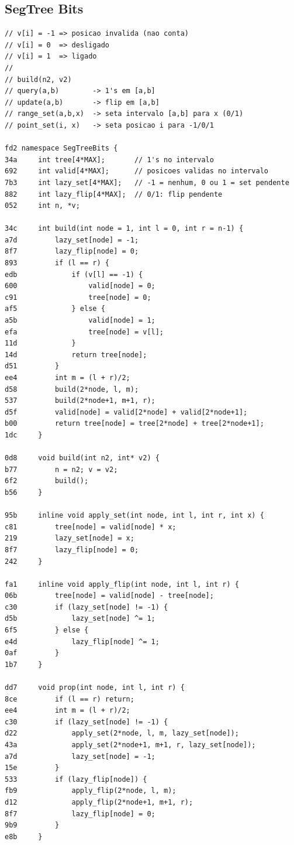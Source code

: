 \documentclass[11pt, a4paper, twoside]{article}
\begin{document}
\subsection{SegTree Bits}
\begin{lstlisting}
// v[i] = -1 => posicao invalida (nao conta)
// v[i] = 0  => desligado
// v[i] = 1  => ligado
//
// build(n2, v2)
// query(a,b)        -> 1's em [a,b]
// update(a,b)       -> flip em [a,b]
// range_set(a,b,x)  -> seta intervalo [a,b] para x (0/1)
// point_set(i, x)   -> seta posicao i para -1/0/1

fd2 namespace SegTreeBits {
34a     int tree[4*MAX];       // 1's no intervalo
692     int valid[4*MAX];      // posicoes validas no intervalo
7b3     int lazy_set[4*MAX];   // -1 = nenhum, 0 ou 1 = set pendente
882     int lazy_flip[4*MAX];  // 0/1: flip pendente
052     int n, *v;
    
34c     int build(int node = 1, int l = 0, int r = n-1) {
a7d         lazy_set[node] = -1;
8f7         lazy_flip[node] = 0;
893         if (l == r) {
edb             if (v[l] == -1) {
600                 valid[node] = 0;
c91                 tree[node] = 0;
af5             } else {
a5b                 valid[node] = 1;
efa                 tree[node] = v[l];
11d             }
14d             return tree[node];
d51         }
ee4         int m = (l + r)/2;
d58         build(2*node, l, m);
537         build(2*node+1, m+1, r);
d5f         valid[node] = valid[2*node] + valid[2*node+1];
b00         return tree[node] = tree[2*node] + tree[2*node+1];
1dc     }
    
0d8     void build(int n2, int* v2) {
b77         n = n2; v = v2;
6f2         build();
b56     }
    
95b     inline void apply_set(int node, int l, int r, int x) {
c81         tree[node] = valid[node] * x;
219         lazy_set[node] = x;
8f7         lazy_flip[node] = 0;
242     }
    
fa1     inline void apply_flip(int node, int l, int r) {
06b         tree[node] = valid[node] - tree[node];
c30         if (lazy_set[node] != -1) {
d5b             lazy_set[node] ^= 1;
6f5         } else {
e4d             lazy_flip[node] ^= 1;
0af         }
1b7     }
    
dd7     void prop(int node, int l, int r) {
8ce         if (l == r) return;
ee4         int m = (l + r)/2;
c30         if (lazy_set[node] != -1) {
d22             apply_set(2*node, l, m, lazy_set[node]);
43a             apply_set(2*node+1, m+1, r, lazy_set[node]);
a7d             lazy_set[node] = -1;
15e         }
533         if (lazy_flip[node]) {
fb9             apply_flip(2*node, l, m);
d12             apply_flip(2*node+1, m+1, r);
8f7             lazy_flip[node] = 0;
9b9         }
e8b     }
    

\end{lstlisting}
\end{document}

